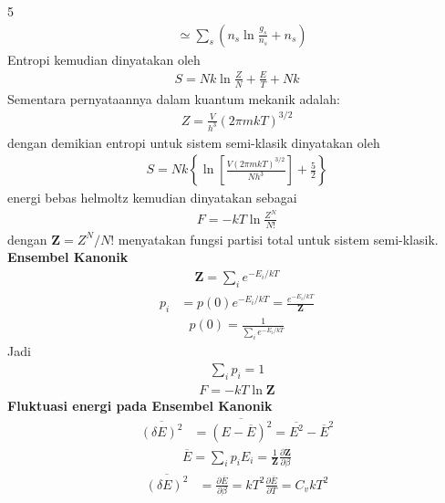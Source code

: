 \documentclass[a4paper  , 6 pt]{article}
\begin{document}
\begin{tiny}
\begin{multicols} {5}
\begin{align}
& \simeq \sum_s \left( n_s \ln \frac{g_s }{n_s } + n_s \right) 
\end{align}
Entropi kemudian dinyatakan oleh 
\begin{align}
S = Nk \ln \frac{Z}{N} + \frac{E}{T} + Nk 
\end{align}
Sementara pernyataannya dalam kuantum mekanik adalah:
\begin{align}
Z = \frac{V}{h^3} (2 \pi m kT)
^{3/2 }
\end{align}
dengan demikian entropi untuk sistem semi-klasik dinyatakan oleh 
\begin{align}
S = Nk \left \lbrace \ln \left [ \frac{V (2 \pi m kT )^{3/2} }{Nh^3} \right ] +
  \frac{5}{2} \right \rbrace  \nonumber
\end{align}
energi bebas helmoltz kemudian dinyatakan sebagai 
\begin{align}
F = - kT \ln \frac{Z^N}{N!} 
\end{align}
dengan $\boldsymbol{Z} = Z^N /N!$ menyatakan fungsi partisi total untuk sistem semi-klasik. \newline
\textbf{Ensembel Kanonik} \newline
\begin{align}
\boldsymbol{Z} = \sum_i e^{- E_i /kT}
\end{align}
\begin{align}
p_i &= p(0) e^{-E_i /k T}  = \frac{e^{-E_i /kT}}{\boldsymbol{Z}}   \label{peluang-kanonik}
\end{align}
\begin{align}
p(0) = \frac{1}{\sum_i e^{- E_i /kT}}
\end{align}
Jadi
\begin{align}
\sum_i p_i = 1 
\end{align}
\begin{align}
F = - kT \ln \boldsymbol{Z}
\end{align}
\newline
\textbf{Fluktuasi energi pada Ensembel Kanonik} 
\begin{align}
\overline{(\delta E)^2 } &= \overline{(E - \overline{E} )^2 }= \overline{E^2} - \overline{E}^2 
\end{align}
\begin{align}
\overline{E} = \sum_i p_i E_i  =  \frac{1}{\boldsymbol{Z}} \frac{\partial \boldsymbol{Z}}{\partial \beta} 
\end{align}
\begin{align}
\overline{(\delta E)^2}& = \frac{\partial \overline{E}}{\partial \beta } = kT^2\frac{\partial \overline{E}}{\partial T} = C_v k T^2  

\end{align}
\end{multicols}
\end{tiny}
\end{document}
